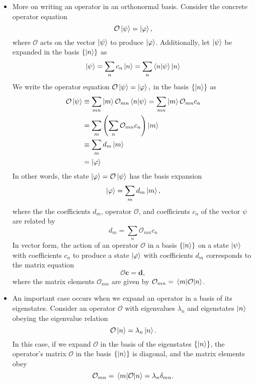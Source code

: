 \documentclass[11pt, a4paper]{article}
\renewcommand{\vec}[1]{\bm{#1}}  %
\renewcommand{\O}{\mathcal{O}}  %
\newcommand{\p}{\psi}  %
\begin{document}
\begin{itemize}
	\item More on writing an operator in an orthonormal basis. Consider the concrete operator equation
	\begin{equation*}
		\O \ket{\psi} = \ket{\varphi},
	\end{equation*}
	where $ \O $ acts on the vector $ \ket{\psi} $ to produce $ \ket{\varphi} $. Additionally, let $ \ket{\psi} $ be expanded in the basis $ \{\ket{n} \} $ as
	\begin{equation*}
		\ket{\psi} = \sum_{n}c_{n} \ket{n} = \sum_{n} \braket{n}{\psi} \ket{n} 
	\end{equation*}
	 We write the operator equation $ \O \ket{\psi} = \ket{\varphi}, $ in the basis $ \{\ket{n}\} $ as
	\begin{align*}
		\O \ket{\p} &\equiv \sum_{mn}\ket{m}\O_{mn}\bra{n}  \ket{\psi} = \sum_{mn}\ket{m} \O_{mn}  c_{n}\\
		& = \sum_{m}\left(\sum_{n}\O_{mn}c_{n}\right) \ket{m} \\
		& \equiv \sum_{m}d_{m}\ket{m} \\
		& = \ket{\varphi}
	\end{align*}
	In other words, the state $ \ket{\varphi} = \O \ket{\p} $ has the basis expansion
	\begin{equation*}
		\ket{\varphi} = \sum_{m} d_{m}\ket{m},
	\end{equation*}
	where the the coefficients $ d_{m} $, operator $ \O $, and coefficients $ c_{n} $ of the vector $ \psi $ are related by 
	\begin{equation*}
		d_{m} = \sum_{n}\O_{mn} c_{n}
	\end{equation*}
	In vector form, the action of an operator $ \O $ in a basis $ \{\ket{n}\} $ on a state $ \ket{\p} $ with coefficients $ c_{n} $ to produce a state $ \ket{\varphi} $ with coefficients $ d_{m} $ corresponds to the matrix equation
	\begin{equation*}
		\bm{\O} \vec{c} = \vec{d},
	\end{equation*}
	where the matrix elements $ \O_{mn} $ are given by $ \O_{mn} = \mel{m}{\O}{n} $.
	
	\item An important case occurs when we expand an operator in a basis of its eigenstates. Consider an operator $ \O $ with eigenvalues $ \lambda_{n} $ and eigenstates $ \ket{n} $ obeying the eigenvalue relation
	\begin{equation*}
		\O \ket{n} = \lambda_{n} \ket{n}.
	\end{equation*}
	In this case, if we expand $ \O $ in the basis of the eigenstates $ \{\ket{n}\} $, the operator's matrix $ \bm{\O} $ in the basis $ \{\ket{n}\} $ is diagonal, and the matrix elements obey
	\begin{equation*}
		\O_{mn} = \mel{m}{\O}{n} = \lambda_{n} \delta_{mn}.
	\end{equation*}
	
\end{itemize}
\end{document}
